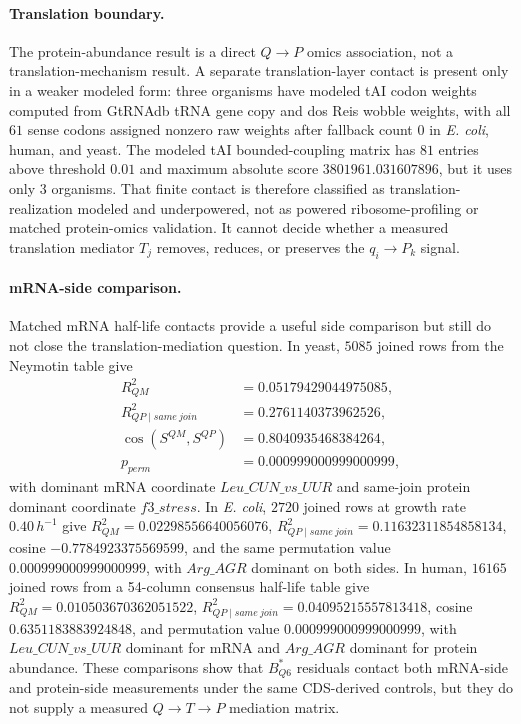 \paragraph{Translation boundary.}
The protein-abundance result is a direct $Q\to P$ omics association, not a translation-mechanism result.  A separate translation-layer contact is present only in a weaker modeled form: three organisms have modeled tAI codon weights computed from GtRNAdb tRNA gene copy and dos Reis wobble weights, with all $61$ sense codons assigned nonzero raw weights after fallback count $0$ in \emph{E. coli}, human, and yeast.  The modeled tAI bounded-coupling matrix has $81$ entries above threshold $0.01$ and maximum absolute score $3801961.031607896$, but it uses only $3$ organisms.  That finite contact is therefore classified as translation-realization modeled and underpowered, not as powered ribosome-profiling or matched protein-omics validation.  It cannot decide whether a measured translation mediator $T_j$ removes, reduces, or preserves the $q_i\to P_k$ signal.

\paragraph{mRNA-side comparison.}
Matched mRNA half-life contacts provide a useful side comparison but still do not close the translation-mediation question.  In yeast, $5085$ joined rows from the Neymotin table give
$$
\begin{aligned}
R^2_{QM} &= 0.05179429044975085,\\
R^2_{QP\mid same\ join} &= 0.2761140373962526,\\
\cos(S^{QM},S^{QP}) &= 0.8040935468384264,\\
p_{perm} &= 0.000999000999000999,
\end{aligned}
$$
with dominant mRNA coordinate $Leu\_CUN\_vs\_UUR$ and same-join protein dominant coordinate $f3\_stress$.  In \emph{E. coli}, $2720$ joined rows at growth rate $0.40\,h^{-1}$ give $R^2_{QM}=0.02298556640056076$, $R^2_{QP\mid same\ join}=0.11632311854858134$, cosine $-0.7784923375569599$, and the same permutation value $0.000999000999000999$, with $Arg\_AGR$ dominant on both sides.  In human, $16165$ joined rows from a 54-column consensus half-life table give $R^2_{QM}=0.010503670362051522$, $R^2_{QP\mid same\ join}=0.04095215557813418$, cosine $0.6351183883924848$, and permutation value $0.000999000999000999$, with $Leu\_CUN\_vs\_UUR$ dominant for mRNA and $Arg\_AGR$ dominant for protein abundance.  These comparisons show that $B^*_{Q6}$ residuals contact both mRNA-side and protein-side measurements under the same CDS-derived controls, but they do not supply a measured $Q\to T\to P$ mediation matrix.

